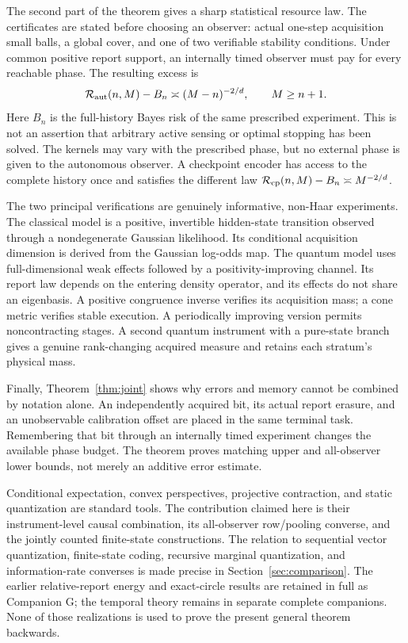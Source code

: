 The second part of the theorem gives a sharp statistical resource law. The certificates are stated before choosing an observer: actual one-step acquisition small balls, a global cover, and one of two verifiable stability conditions. Under common positive report support, an internally timed observer must pay for every reachable phase. The resulting excess is
\[
 \mathcal R_{\rm aut}(n,M)-B_n\asymp(M-n)^{-2/d},\qquad M\ge n+1.
\]
Here $B_n$ is the full-history Bayes risk of the same prescribed experiment. This is not an assertion that arbitrary active sensing or optimal stopping has been solved. The kernels may vary with the prescribed phase, but no external phase is given to the autonomous observer. A checkpoint encoder has access to the complete history once and satisfies the different law $\mathcal R_{\rm cp}(n,M)-B_n\asymp M^{-2/d}$.

The two principal verifications are genuinely informative, non-Haar experiments. The classical model is a positive, invertible hidden-state transition observed through a nondegenerate Gaussian likelihood. Its conditional acquisition dimension is derived from the Gaussian log-odds map. The quantum model uses full-dimensional weak effects followed by a positivity-improving channel. Its report law depends on the entering density operator, and its effects do not share an eigenbasis. A positive congruence inverse verifies its acquisition mass; a cone metric verifies stable execution. A periodically improving version permits noncontracting stages. A second quantum instrument with a pure-state branch gives a genuine rank-changing acquired measure and retains each stratum's physical mass.

Finally, Theorem~\ref{thm:joint} shows why errors and memory cannot be combined by notation alone. An independently acquired bit, its actual report erasure, and an unobservable calibration offset are placed in the same terminal task. Remembering that bit through an internally timed experiment changes the available phase budget. The theorem proves matching upper and all-observer lower bounds, not merely an additive error estimate.

Conditional expectation, convex perspectives, projective contraction, and static quantization are standard tools. The contribution claimed here is their instrument-level causal combination, its all-observer row/pooling converse, and the jointly counted finite-state constructions. The relation to sequential vector quantization, finite-state coding, recursive marginal quantization, and information-rate converses is made precise in Section~\ref{sec:comparison}. The earlier relative-report energy and exact-circle results are retained in full as Companion G; the temporal theory remains in separate complete companions. None of those realizations is used to prove the present general theorem backwards.

